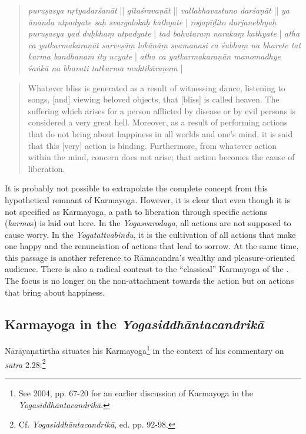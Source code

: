 \begin{quote}
  \textit{puruṣasya nṛtyadarśanāt} || \textit{gītaśravaṇāt} || \textit{vallabhavastuno darśaṇāt} || \textit{ya ānanda utpadyate saḥ svargalokaḥ kathyate} | \textit{rogapīḍito durjanebhyaḥ puruṣasya yad duḥkhaṃ utpadyate} | \textit{tad bahutaraṃ narakaṃ kathyate} | \textit{atha ca yatkarmakaraṇāt sarveṣāṃ lokānāṃ svamanasi ca śubhaṃ na bharete tat karma bandhanam ity ucyate} | \textit{atha ca yatkarmakaraṇān manomadhye śaṅkā na bhavati tatkarma muktikāraṇam} | 
\end{quote}
\begin{quote}
Whatever bliss is generated as a result of witnessing dance, listening to songs, [and] viewing beloved objects, that [bliss] is called heaven. The suffering which arises for a person afflicted by disease or by evil persons is considered a very great hell. Moreover, as a result of performing actions that do not bring about happiness in all worlds and one’s mind, it is said that this [very] action is binding. Furthermore, from whatever action within the mind, concern does not arise; that action becomes the cause of liberation.
  \end{quote}

It is probably not possible to extrapolate the complete concept from this hypothetical remnant of Karmayoga. However, it is clear that even though it is not specified as Karmayoga, a path to liberation through specific actions (\textit{karma}s) is laid out here. In the \textit{Yogasvarodaya}, all actions are not supposed to cause worry. In the \textit{Yogatattvabindu}, it is the cultivation of all actions that make one happy and the renunciation of actions that lead to sorrow. At the same time, this passage is another reference to Rāmacandra's wealthy and pleasure-oriented audience. There is also a radical contrast to the ``classical'' Karmayoga of the . The focus is no longer on the non-attachment towards the action but on actions that bring about happiness.

\subsection{Karmayoga in the \textit{Yogasiddhāntacandrikā}}

Nārāyaṇatīrtha situates his Karmayoga\footnote{See \citeauthor{penna2004} 2004, pp. 67-20 for an earlier discussion of Karmayoga in the \textit{Yogasiddhāntacandrikā}.} in the context of his commentary on \textit{sūtra} 2.28:\footnote{Cf. \textit{Yogasiddhāntacandrikā}, ed. pp. 92-98.}

